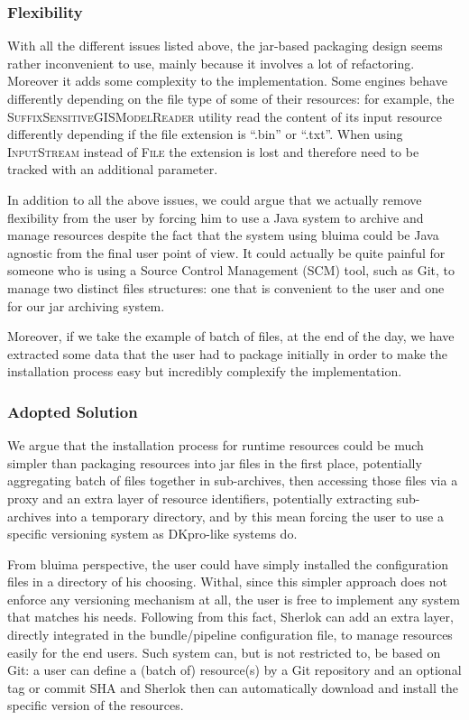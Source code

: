 \documentclass{article}
\newcommand{\ID}[1]{{\textsc{#1}}}
\begin{document}
\subsubsection{Flexibility}

With all the different issues listed above, the jar-based packaging design seems rather inconvenient
to use, mainly because it involves a lot of refactoring. Moreover it adds some complexity to the
implementation. Some engines behave differently depending on the file type of some of their
resources: for example, the \ID{SuffixSensitiveGISModelReader} utility read the content of its input
resource differently depending if the file extension is ``.bin'' or ``.txt''. When using
\ID{InputStream} instead of \ID{File} the extension is lost and therefore need to be tracked with an
additional parameter.

In addition to all the above issues, we could argue that we actually remove flexibility from the
user by forcing him to use a Java system to archive and manage resources despite the fact that the
system using bluima could be Java agnostic from the final user point of view. It could actually be
quite painful for someone who is using a Source Control Management (SCM) tool, such as Git, to
manage two distinct files structures: one that is convenient to the user and one for our jar
archiving system.

Moreover, if we take the example of batch of files, at the end of the day, we have extracted some
data that the user had to package initially in order to make the installation process easy but
incredibly complexify the implementation.


\subsubsection{Adopted Solution}

We argue that the installation process for runtime resources could be much simpler than packaging
resources into jar files in the first place, potentially aggregating batch of files together in
sub-archives, then accessing those files via a proxy and an extra layer of resource identifiers,
potentially extracting sub-archives into a temporary directory, and by this mean forcing the user to
use a specific versioning system as DKpro-like systems do.

From bluima perspective, the user could have simply installed the configuration files in a directory
of his choosing. Withal, since this simpler approach does not enforce any versioning mechanism at
all, the user is free to implement any system that matches his needs. Following from this fact,
Sherlok can add an extra layer, directly integrated in the bundle/pipeline configuration file, to
manage resources easily for the end users. Such system can, but is not restricted to, be based on
Git: a user can define a (batch of) resource(s) by a Git repository and an optional tag or commit
SHA and Sherlok then can automatically download and install the specific version of the resources.
\end{document}
